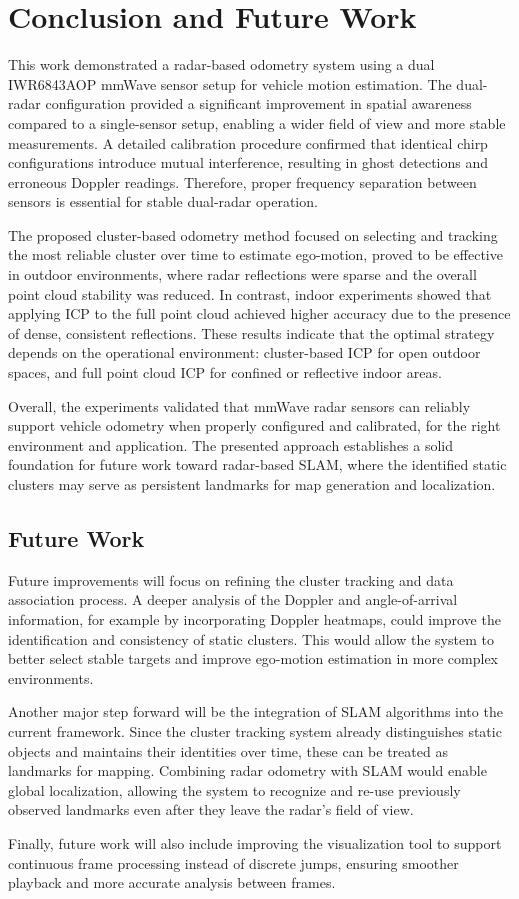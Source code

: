 \newpage
\section{Conclusion and Future Work}
This work demonstrated a radar-based odometry system using a dual IWR6843AOP mmWave sensor setup for vehicle motion estimation.  
The dual-radar configuration provided a significant improvement in spatial awareness compared to a single-sensor setup, enabling a wider field of view and more stable measurements.  
A detailed calibration procedure confirmed that identical chirp configurations introduce mutual interference, resulting in ghost detections and erroneous Doppler readings.  
Therefore, proper frequency separation between sensors is essential for stable dual-radar operation.

The proposed cluster-based odometry method focused on selecting and tracking the most reliable cluster over time to estimate ego-motion, proved to be effective in outdoor environments, where radar reflections were sparse and the overall point cloud stability was reduced.  
In contrast, indoor experiments showed that applying ICP to the full point cloud achieved higher accuracy due to the presence of dense, consistent reflections.  
These results indicate that the optimal strategy depends on the operational environment: cluster-based ICP for open outdoor spaces, and full point cloud ICP for confined or reflective indoor areas.

Overall, the experiments validated that mmWave radar sensors can reliably support vehicle odometry when properly configured and calibrated, for the right environment and application.
The presented approach establishes a solid foundation for future work toward radar-based SLAM, where the identified static clusters may serve as persistent landmarks for map generation and localization.

\subsection{Future Work}

Future improvements will focus on refining the cluster tracking and data association process.  
A deeper analysis of the Doppler and angle-of-arrival information, for example by incorporating Doppler heatmaps, could improve the identification and consistency of static clusters.  
This would allow the system to better select stable targets and improve ego-motion estimation in more complex environments.

Another major step forward will be the integration of SLAM algorithms into the current framework.  
Since the cluster tracking system already distinguishes static objects and maintains their identities over time, these can be treated as landmarks for mapping.  
Combining radar odometry with SLAM would enable global localization, allowing the system to recognize and re-use previously observed landmarks even after they leave the radar’s field of view.  

Finally, future work will also include improving the visualization tool to support continuous frame processing instead of discrete jumps, ensuring smoother playback and more accurate analysis between frames.
